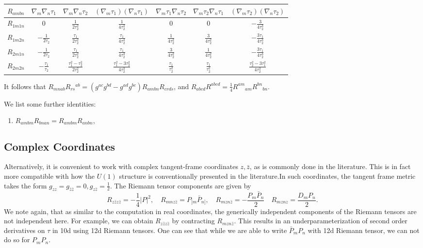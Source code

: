 \medskip
\renewcommand{\arraystretch}{1.8}
\begin{tabular}{c|cccccc}
\toprule
$R_{ambn}$ 
  & $\nabla_m\nabla_n\tau_1$ 
  & $\nabla_m\nabla_n\tau_2$ 
  & $(\nabla_m\tau_1)(\nabla_n\tau_1)$ 
  & $\nabla_m\tau_1\nabla_n\tau_2$ 
  & $\nabla_m\tau_2\nabla_n\tau_1$ 
  & $(\nabla_m\tau_2)(\nabla_n\tau_2)$ \\
\midrule
$R_{1m1n}$ & $0$ & $\frac{1}{2\tau_2^2}$ & $\frac{1}{4\tau_2^3}$ & $0$ & $0$ & $-\frac{3}{4\tau_2^3}$ \\
$R_{1m2n}$ & $-\frac{1}{2\tau_2}$ & $\frac{\tau_1}{2\tau_2^2}$ & $\frac{\tau_1}{4\tau_2^3}$ & $\frac{1}{4\tau_2^2}$ & $\frac{3}{4\tau_2^2}$ & $-\frac{3\tau_1}{4\tau_2^3}$ \\
$R_{2m1n}$ & $-\frac{1}{2\tau_2}$ & $\frac{\tau_1}{2\tau_2^2}$ & $\frac{\tau_1}{4\tau_2^3}$ & $\frac{3}{4\tau_2^2}$ & $\frac{1}{4\tau_2^2}$ & $-\frac{3\tau_1}{4\tau_2^3}$ \\
$R_{2m2n}$ & $-\frac{\tau_1}{\tau_2}$ & $\frac{\tau_1^2-\tau_2^2}{2\tau_2^2}$ & $\frac{\tau_1^2-3\tau_2^2}{4\tau_2^3}$ & $\frac{\tau_1}{\tau_2^2}$ & $\frac{\tau_1}{\tau_2^2}$ & $\frac{\tau_2^2-3\tau_1^2}{4\tau_2^3}$ \\
\bottomrule
\end{tabular}
\medskip



It follows that $R_{mnab}R_{rs}{}^{ab} = (g^{ac}g^{bd}-g^{ad}g^{bc}) R_{ambn} R_{crds}$, and $R_{abcd}R^{abcd} = \tfrac14 R^{am}{}_{am} R^{bn}{}_{bn}$.

We list some further identities:
\begin{enumerate}
    \item $R_{ambm} R_{bnan} = R_{ambm} R_{anbn}$,
\end{enumerate}



\subsection{Complex Coordinates}
Alternatively, it is convenient to work with complex tangent-frame coordinates $z,\bar{z}$, as is commonly done in the literature.
This is in fact more compatible with how the $U(1)$ structure is conventionally presented in the literature.In such coordinates, the tangent frame metric takes the form $g_{zz} = g_{\bar{z}\bar{z}} = 0, g_{z\bar{z}} = \tfrac12$.
The Riemann tensor components are given by
\begin{equation}
R_{z\bar{z}z\bar{z}} = -\frac14 |P|^2,\quad
R_{mnz\bar{z}} = P_{[m}\bar{P}_{n]},\quad
R_{mzn\bar{z}} = - \frac{P_m \bar{P}_n}{2}\quad
R_{mznz} = \frac{D_m P_n}{2}.
\end{equation}
We note again, that as similar to the computation in real coordinates, the generically independent components of the Riemann tensors are not independent here. For example, we can obtain $R_{z\bar{z}z\bar{z}}$ by contracting $R_{mzn\bar{z}}$. 
This results in an underparameterization of second order derivatives on $\tau$ in 10d using 12d Riemann tensors.
One can see that while we are able to write $\bar{P}_m P_n$ with 12d Riemann tensor, we can not do so for $P_m P_n$. 

